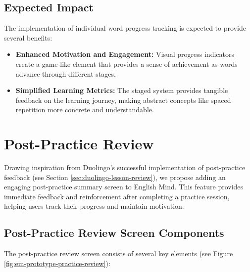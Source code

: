 \subsection*{Expected Impact}

The implementation of individual word progress tracking is expected to provide several benefits:

\begin{itemize}
    \item \textbf{Enhanced Motivation and Engagement:} Visual progress indicators create a game-like element that provides a sense of achievement as words advance through different stages.
    
    \item \textbf{Simplified Learning Metrics:} The staged system provides tangible feedback on the learning journey, making abstract concepts like spaced repetition more concrete and understandable.
\end{itemize}

\section{Post-Practice Review}

Drawing inspiration from Duolingo's successful implementation of post-practice feedback (see Section \ref{sec:duolingo-lesson-review}), we propose adding an engaging post-practice summary screen to English Mind. This feature provides immediate feedback and reinforcement after completing a practice session, helping users track their progress and maintain motivation.

\subsection*{Post-Practice Review Screen Components}

The post-practice review screen consists of several key elements (see Figure \ref{fig:em-prototype-practice-review}):


